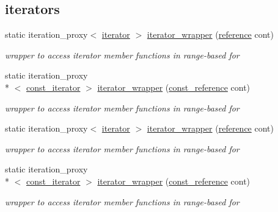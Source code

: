 \subsection*{iterators}
\begin{DoxyCompactItemize}
\item 
static iteration\-\_\-proxy$<$ \hyperlink{classnlohmann_1_1basic__json_1_1iterator}{iterator} $>$ \hyperlink{classnlohmann_1_1basic__json_ab936779c70bec68343ef440ed13251e5}{iterator\-\_\-wrapper} (\hyperlink{classnlohmann_1_1basic__json_a3ec8e17be8732fe436e9d6733f52b7a3}{reference} cont)
\begin{DoxyCompactList}\small\item\em wrapper to access iterator member functions in range-\/based for \end{DoxyCompactList}\item 
static iteration\-\_\-proxy\\*
$<$ \hyperlink{classnlohmann_1_1basic__json_1_1const__iterator}{const\-\_\-iterator} $>$ \hyperlink{classnlohmann_1_1basic__json_af148cdab12df5bf86119fac735ccaac5}{iterator\-\_\-wrapper} (\hyperlink{classnlohmann_1_1basic__json_af677a29b0e66edc9f66e5167e4667071}{const\-\_\-reference} cont)
\begin{DoxyCompactList}\small\item\em wrapper to access iterator member functions in range-\/based for \end{DoxyCompactList}\item 
static iteration\-\_\-proxy$<$ \hyperlink{classnlohmann_1_1basic__json_1_1iterator}{iterator} $>$ \hyperlink{classnlohmann_1_1basic__json_ab936779c70bec68343ef440ed13251e5}{iterator\-\_\-wrapper} (\hyperlink{classnlohmann_1_1basic__json_a3ec8e17be8732fe436e9d6733f52b7a3}{reference} cont)
\begin{DoxyCompactList}\small\item\em wrapper to access iterator member functions in range-\/based for \end{DoxyCompactList}\item 
static iteration\-\_\-proxy\\*
$<$ \hyperlink{classnlohmann_1_1basic__json_1_1const__iterator}{const\-\_\-iterator} $>$ \hyperlink{classnlohmann_1_1basic__json_af148cdab12df5bf86119fac735ccaac5}{iterator\-\_\-wrapper} (\hyperlink{classnlohmann_1_1basic__json_af677a29b0e66edc9f66e5167e4667071}{const\-\_\-reference} cont)
\begin{DoxyCompactList}\small\item\em wrapper to access iterator member functions in range-\/based for \end{DoxyCompactList}\item 

\end{DoxyCompactItemize}
